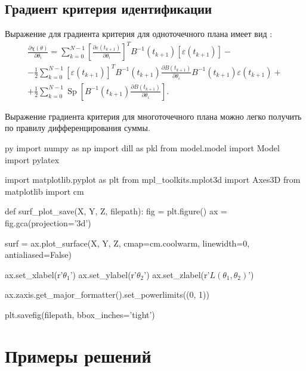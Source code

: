 \documentclass[a4paper,14pt]{extarticle}
\DeclareMathOperator{\Sp}{Sp}
\newcommand{\eps}{\varepsilon}
\begin{document}
\subsection{Градиент критерия идентификации}

Выражение для градиента критерия для одноточечного плана имеет вид \cite{mono}:
\begin{equation*}
\begin{split}
  \frac{\partial \chi(\theta)}{\partial \theta_i} = \sum\limits_{k=0}^{N-1}
  \left[ \frac{\partial \eps(t_{k+1})}{\partial \theta_i} \right]^T
  B^{-1}(t_{k+1}) \left[ \eps(t_{k+1}) \right] - \\
  - \frac{1}{2}
  \sum\limits_{k=0}^{N-1} \left[ \eps(t_{k+1}) \right]^T B^{-1}(t_{k+1})
  \frac{\partial B(t_{k+1})}{\partial \theta_i} B^{-1}(t_{k+1}) \eps(t_{k+1}) +
  \\ + 
  \frac{1}{2} \sum\limits_{k=0}^{N-1} \Sp \left[ B^{-1}(t_{k+1})
  \frac{\partial B(t_{k+1})}{\partial \theta_i} \right]. 
\end{split}
\end{equation*}

Выражение градиента критерия для многоточечного плана можно легко получить по
правилу дифференцирования суммы.

\begin{pythontexcustomcode}{py}
import numpy as np
import dill as pkl
from model.model import Model
import pylatex

import matplotlib.pyplot as plt
from mpl_toolkits.mplot3d import Axes3D
from matplotlib import cm

def surf_plot_save(X, Y, Z, filepath):
    fig = plt.figure()
    ax = fig.gca(projection='3d')

    surf = ax.plot_surface(X, Y, Z, cmap=cm.coolwarm,
                           linewidth=0, antialiased=False)

    ax.set_xlabel(r'$\theta_1$')
    ax.set_ylabel(r'$\theta_2$')
    ax.set_zlabel(r'$L(\theta_1, \theta_2)$')

    ax.zaxis.get_major_formatter().set_powerlimits((0, 1))

    plt.savefig(filepath, bbox_inches='tight')
\end{pythontexcustomcode}

\section{Примеры решений}
\end{document}
